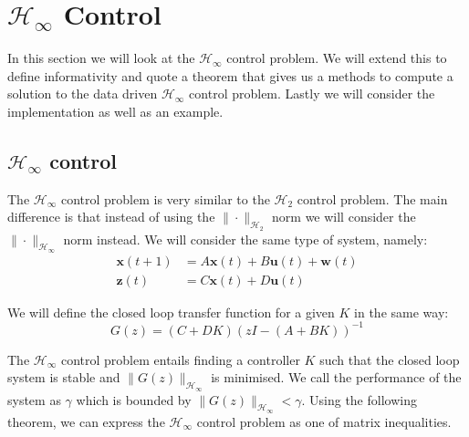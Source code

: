 \section{$\mathcal{H}_\infty$ Control}
In this section we will look at the $\mathcal{H}_\infty$ control problem. We will extend this to define informativity and quote a theorem that gives us a methods to compute a solution to the data driven $\mathcal{H}_\infty$ control problem. Lastly we will consider the implementation as well as an example.

\subsection{$\mathcal{H}_\infty$ control}
The $\mathcal{H}_\infty$ control problem is very similar to the $\mathcal{H}_2$ control problem. The main difference is that instead of using the $\| \cdot \|_{\mathcal{H}_2}$ norm we will consider the $\| \cdot \|_{\mathcal{H}_\infty}$ norm instead. We will consider the same type of system, namely:
\begin{align*}
	\mathbf{x}(t+1) &= A \mathbf{x}(t) + B \mathbf{u}(t) + \mathbf{w}(t) \\
	\mathbf{z}(t)   &= C \mathbf{x}(t) + D \mathbf{u}(t)
\end{align*}

We will define the closed loop transfer function for a given $K$ in the same way:
\begin{equation*}
	G(z) = (C + DK)(z I - (A+BK))^{-1}
\end{equation*}

The $\mathcal{H}_\infty$ control problem entails finding a controller $K$ such that the closed loop system is stable and $\| G(z) \|_{\mathcal{H}_\infty}$ is minimised. We call the performance of the system as $\gamma$ which is bounded by $\| G(z) \|_{\mathcal{H}_\infty} < \gamma$. Using the following theorem, we can express the $\mathcal{H}_\infty$ control problem as one of matrix inequalities. 

